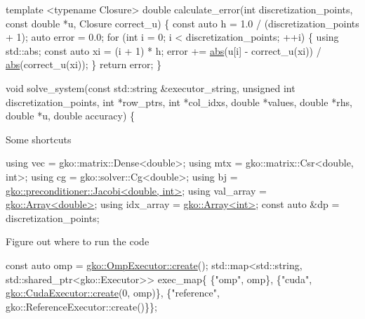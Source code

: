 \begin{DoxyCode}
\textcolor{keyword}{template} <\textcolor{keyword}{typename} Closure>
\textcolor{keywordtype}{double} calculate\_error(\textcolor{keywordtype}{int} discretization\_points, \textcolor{keyword}{const} \textcolor{keywordtype}{double} *u,
                       Closure correct\_u)
\{
    \textcolor{keyword}{const} \textcolor{keyword}{auto} h = 1.0 / (discretization\_points + 1);
    \textcolor{keyword}{auto} error = 0.0;
    \textcolor{keywordflow}{for} (\textcolor{keywordtype}{int} i = 0; i < discretization\_points; ++i) \{
        \textcolor{keyword}{using} std::abs;
        \textcolor{keyword}{const} \textcolor{keyword}{auto} xi = (i + 1) * h;
        error += \hyperlink{namespacegko_a57797fc0a00fd4b7ff34ca4bfc84bc51}{abs}(u[i] - correct\_u(xi)) / \hyperlink{namespacegko_a57797fc0a00fd4b7ff34ca4bfc84bc51}{abs}(correct\_u(xi));
    \}
    \textcolor{keywordflow}{return} error;
\}


\textcolor{keywordtype}{void} solve\_system(\textcolor{keyword}{const} std::string &executor\_string,
                  \textcolor{keywordtype}{unsigned} \textcolor{keywordtype}{int} discretization\_points, \textcolor{keywordtype}{int} *row\_ptrs,
                  \textcolor{keywordtype}{int} *col\_idxs, \textcolor{keywordtype}{double} *values, \textcolor{keywordtype}{double} *rhs, \textcolor{keywordtype}{double} *u,
                  \textcolor{keywordtype}{double} accuracy)
\{
\end{DoxyCode}


Some shortcuts


\begin{DoxyCode}
\textcolor{keyword}{using} vec = gko::matrix::Dense<double>;
\textcolor{keyword}{using} mtx = gko::matrix::Csr<double, int>;
\textcolor{keyword}{using} cg = gko::solver::Cg<double>;
\textcolor{keyword}{using} bj = \hyperlink{classgko_1_1preconditioner_1_1Jacobi}{gko::preconditioner::Jacobi<double, int>};
\textcolor{keyword}{using} val\_array = \hyperlink{classgko_1_1Array}{gko::Array<double>};
\textcolor{keyword}{using} idx\_array = \hyperlink{classgko_1_1Array}{gko::Array<int>};
\textcolor{keyword}{const} \textcolor{keyword}{auto} &dp = discretization\_points;
\end{DoxyCode}


Figure out where to run the code


\begin{DoxyCode}
\textcolor{keyword}{const} \textcolor{keyword}{auto} omp = \hyperlink{classgko_1_1OmpExecutor_a33ca05fdd0fc928ee262fc9425304874}{gko::OmpExecutor::create}();
std::map<std::string, std::shared\_ptr<gko::Executor>> exec\_map\{
    \{\textcolor{stringliteral}{"omp"}, omp\},
    \{\textcolor{stringliteral}{"cuda"}, \hyperlink{classgko_1_1CudaExecutor_a2718a92034350650ef406ffdb60db090}{gko::CudaExecutor::create}(0, omp)\},
    \{\textcolor{stringliteral}{"reference"}, gko::ReferenceExecutor::create()\}\};
\end{DoxyCode}


